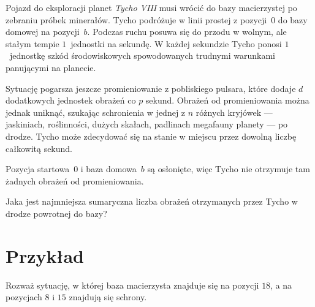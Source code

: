 

\noindent
Pojazd do eksploracji planet \emph{Tycho VIII} musi wrócić do bazy macierzystej po zebraniu próbek minerałów.
Tycho podróżuje w linii prostej z pozycji~$0$ do bazy domowej na pozycji~$b$.
Podczas ruchu posuwa się do przodu w wolnym, ale stałym tempie $1$~jednostki na sekundę.
W każdej sekundzie Tycho ponosi $1$~jednostkę szkód środowiskowych spowodowanych trudnymi warunkami panującymi na planecie.

Sytuację pogarsza jeszcze promieniowanie z pobliskiego pulsara, które dodaje $d$ dodatkowych jednostek obrażeń co $p$ sekund.
Obrażeń od promieniowania można jednak uniknąć, szukając schronienia w jednej z $n$ różnych kryjówek --- jaskiniach, roślinności, dużych skałach, padlinach megafauny planety --- po drodze.
Tycho może zdecydować się na stanie w miejscu przez dowolną liczbę całkowitą sekund.

Pozycja startowa~$0$ i baza domowa~$b$ są osłonięte, więc Tycho nie otrzymuje tam żadnych obrażeń od promieniowania.

\medskip
Jaka jest najmniejsza sumaryczna liczba obrażeń otrzymanych przez Tycho w drodze powrotnej do bazy?

\section*{Przykład}

Rozważ sytuację, w której baza macierzysta znajduje się na pozycji $18$, a na pozycjach $8$ i $15$ znajdują się schrony.

